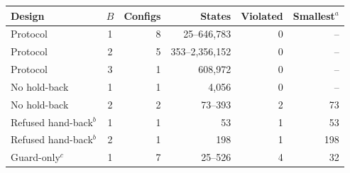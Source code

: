 
\begin{tabular}{@{}lcrrrr@{}}
\toprule
Design & $B$ & Configs & States & Violated & Smallest$^a$ \\
\midrule
Protocol & 1 & 8 & 25--646,783 & 0 & -- \\
Protocol & 2 & 5 & 353--2,356,152 & 0 & -- \\
Protocol & 3 & 1 & 608,972 & 0 & -- \\
No hold-back & 1 & 1 & 4,056 & 0 & -- \\
No hold-back & 2 & 2 & 73--393 & 2 & 73 \\
Refused hand-back$^b$ & 1 & 1 & 53 & 1 & 53 \\
Refused hand-back$^b$ & 2 & 1 & 198 & 1 & 198 \\
Guard-only$^c$ & 1 & 7 & 25--526 & 4 & 32 \\
\bottomrule
\end{tabular}
